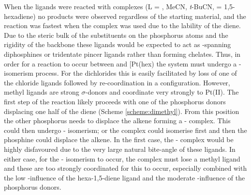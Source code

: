 When the \tBuxantphos{} ligands were reacted with \ce{[PtL2Cl2]} complexes (L = , MeCN, \emph{t}-BuCN,  = 1,5-hexadiene) no \cis{} products were observed regardless of the starting material, and the reaction was fastest when the \cis{} complex  was used due to the lability of the diene.  Due to the steric bulk of the \tBu{} substituents on the phosphorus atoms and the rigidity of the \tBuxantphos{} backbone these ligands would be expected to act as \trans{}-spanning diphosphines or tridentate \POP{} pincer ligands rather than forming \cis{} chelates.  Thus, in order for a reaction to occur between \tBuxantphos{} and [Pt(\acrshort{hex})\ce{Me2]} the system must undergo a \cis-\trans{} isomerism process.  For the dichlorides this is easily facilitated by loss of one of the chloride ligands followed by re-coordination in a \trans{} configuration.  However, methyl ligands are strong $\sigma$-donors and coordinate very strongly to Pt(II).\cite{Appleton1978}  The first step of the reaction likely proceeds with one of the phosphorus donors displacing one half of the diene (Scheme \ref{scheme:dimethyl}).   From this position the other phosphorus needs to displace the alkene forming a \cis{}-\tBuxantphos{} complex.  This could then undergo \cis-\trans{} isomerism; or the complex could isomerise first and then the phosphine could displace the alkene.  In the first case, the \cis-\tBuxantphos{} complex would be highly disfavoured due to the very large natural bite-angle of these ligands.  In either case, for the \cis-\trans{} isomerism to occur, the complex must lose a methyl ligand and these are too strongly coordinated for this to occur, especially combined with the low \trans{}-influence of the hexa-1,5-diene ligand and the moderate \trans{}-influence of the phosphorus donors.\cite{Rigamonti2010, Pregosin1980, Appleton1978}



